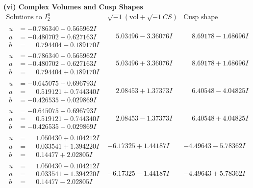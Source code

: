 \documentclass[1p]{elsarticle_modified}
\theoremstyle{definition}
\newcommand{\I}{\sqrt{-1}}
\begin{document}
\newpage\flushleft \textbf{(vi) Complex Volumes and Cusp Shapes}
$$\begin{array}{c|c|c}  
\text{Solutions to }I^u_{2}& \I (\text{vol} + \sqrt{-1}CS) & \text{Cusp shape}\\
 \hline 
\begin{aligned}
u &= -0.786340 + 0.565962 I \\
a &= -0.480702 - 0.627163 I \\
b &= \phantom{-}0.794404 - 0.189170 I\end{aligned}
 & \phantom{-}5.03496 - 3.36076 I & \phantom{-}8.69178 - 1.68696 I \\ \hline\begin{aligned}
u &= -0.786340 - 0.565962 I \\
a &= -0.480702 + 0.627163 I \\
b &= \phantom{-}0.794404 + 0.189170 I\end{aligned}
 & \phantom{-}5.03496 + 3.36076 I & \phantom{-}8.69178 + 1.68696 I \\ \hline\begin{aligned}
u &= -0.645075 + 0.696793 I \\
a &= \phantom{-}0.519121 + 0.744340 I \\
b &= -0.426535 - 0.029869 I\end{aligned}
 & \phantom{-}2.08453 + 1.37373 I & \phantom{-}6.40548 - 4.04825 I \\ \hline\begin{aligned}
u &= -0.645075 - 0.696793 I \\
a &= \phantom{-}0.519121 - 0.744340 I \\
b &= -0.426535 + 0.029869 I\end{aligned}
 & \phantom{-}2.08453 - 1.37373 I & \phantom{-}6.40548 + 4.04825 I \\ \hline\begin{aligned}
u &= \phantom{-}1.050430 + 0.104212 I \\
a &= \phantom{-}0.033541 + 1.394220 I \\
b &= \phantom{-}0.14477 + 2.02805 I\end{aligned}
 & -6.17325 + 1.44187 I & -4.49643 - 5.78362 I \\ \hline\begin{aligned}
u &= \phantom{-}1.050430 - 0.104212 I \\
a &= \phantom{-}0.033541 - 1.394220 I \\
b &= \phantom{-}0.14477 - 2.02805 I\end{aligned}
 & -6.17325 - 1.44187 I & -4.49643 + 5.78362 I \\ \hline\begin{aligned}

\end{aligned}
\end{array}$$
\end{document}
